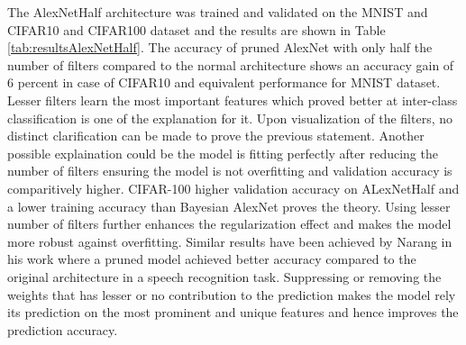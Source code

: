 The AlexNetHalf architecture was trained and validated on the MNIST and CIFAR10 and CIFAR100 dataset and the results are shown in Table \ref{tab:resultsAlexNetHalf}. The accuracy of pruned AlexNet with only half the number of filters compared to the normal architecture shows an accuracy gain of 6 percent in case of CIFAR10 and equivalent performance for MNIST dataset. Lesser filters learn the most important features which proved better at inter-class classification is one of the explanation for it. Upon visualization of the filters, no distinct clarification can be made to prove the previous statement.  
Another possible explaination could be the model is fitting perfectly after reducing the number of filters ensuring the model is not overfitting and validation accuracy is comparitively higher. CIFAR-100 higher validation accuracy on ALexNetHalf and a lower training accuracy than Bayesian AlexNet proves the theory. Using lesser number of filters further enhances the regularization effect and makes the model more robust against overfitting. Similar results have been achieved by Narang \cite{DBLP:journals/corr/NarangDSE17} in his work where a pruned model achieved better accuracy compared to the original architecture in a speech recognition task. Suppressing or removing the weights that has lesser or no contribution to the prediction makes the model rely its prediction on the most prominent and unique features and hence improves the prediction accuracy.

\begin{table}[H]
\tiny
    \centering
    \renewcommand{\arraystretch}{1.5}
    \renewcommand{\arraystretch}{1.5}
    \caption{Comparison of validation accuracies (in percentage) for AlexNet with variational inference (VI), AlexNet with frequentist inference and AlexNet with half number of filters halved for MNIST, CIFAR-10 and CIFAR-100 datasets.}
    \label{tab:resultsAlexNetHalf}
\end{table}


